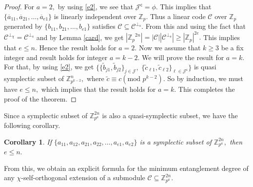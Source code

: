 \documentclass{article}
\newtheorem{cor}{Corollary}[section]
\theoremstyle{remark}
\theoremstyle{definition}
\numberwithin{equation}{section}
\begin{document}
\begin{proof}
  
  
For $a=2,$ by using  \eqref{e2}, we see that $\mathcal{J}^\mathsf{c}=\phi.$ This implies that $\{\overline{a}_{11},\overline{a}_{21},\ldots,\overline{a}_{e1}\}$ is linearly independent over $\mathbb{Z}_{p}.$  Thus  a linear code $\mathcal{C}$ over  $\mathbb{Z}_p$ generated by  $\{b_{11},b_{21},\ldots,b_{e1}\}$ satisfies $\mathcal{C} \subseteq \mathcal{C}^{\perp_{\mathrm{s}}}.$ From this and using the fact that $\mathcal{C}^{\perp_\chi}=\mathcal{C}^{\perp_{\mathrm{s}}}$ and by Lemma \ref{card},   we get $|{\mathbb{Z}_p}^{2n}|=|\mathcal{C}||\mathcal{C}^{\perp_{\mathrm{s}}}|\geq |{\mathbb{Z}_p}|^{2e}.$ This implies that $e \leq n.$  Hence the result holds for $a=2.$   Now we assume that $k\geq 3$  be a fix integer and result holds for integer $a=k-2.$
  We will prove the result for $a=k.$ For that, by using \eqref{e2}, we get $\{ \{\tilde{b}_{j1},\tilde{b}_{j2}\}_{j \in \mathcal{J}},$   $ \{\tilde{c}_{\ell1},\tilde{c}_{\ell2}\}_{\ell \in \mathcal{J}^\mathsf{c}}\}$ is quasi symplectic subset of $\mathbb{Z}_{p^{k-2}}^n,$ where $\tilde{c}\equiv c  (\text{mod~}p^{k-2}).$ So by induction, we must have $e \leq n,$ which implies that the result holds for $a=k.$ This completes the proof of the theorem. 
\end{proof}

Since a symplectic subset of $\mathbb{Z}_{p^a}^{2n}$ is also a quasi-symplectic subset, we have the following corollary.

\begin{cor}\label{cor2} If $\{a_{11},a_{12},a_{21},a_{22},\ldots,a_{e1},a_{e2}\}$ is  a symplectic subset of ${\mathbb{Z}^{2n}_{p^a}},$ then $e \leq n.$ \end{cor}

From this, we obtain an explicit formula for the minimum entanglement degree of any $\chi$-self-orthogonal extension of a submodule $\mathcal{C} \subseteq \mathbb{Z}_{p^a}^{2n}.$
\end{document}
